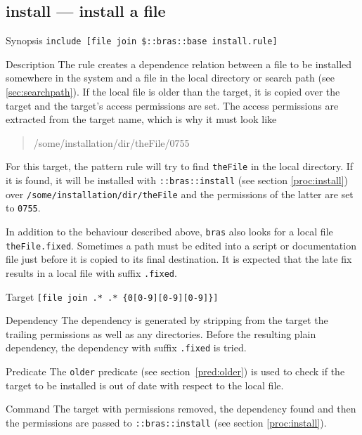 \documentclass[11pt,bibtotoc,idxtotoc]{scrreprt}
\makeatletter
\newcommand{\bras}{\texttt{bras}}
\newcommand{\indextt}[1]{\index{#1@\texttt{#1}}}
\newcommand{\Indextt}[1]{\texttt{#1}\index{#1@\texttt{#1}}}
\makeatother
\begin{document}
\subsection{install --- install a file}
\label{sec:install}
\begin{Describe}
\item[Synopsis] \texttt{include [file join \$::bras::base
    install.rule]}
\item[Description] The rule creates a dependence relation between a
  file to be installed somewhere in the system and a file in the local 
  directory or search path (see \ref{sec:searchpath}). If the local
  file is older than the target, it is copied over the target and the
  target's access permissions are set. The access permissions are
  extracted from the target name, which is why it must look like
  \begin{quote}\ttfamily
    /some/installation/dir/theFile/0755
  \end{quote}
  For this target, the pattern rule will try to find \texttt{theFile}
  in the local directory. If it is found, it will be installed with
  \texttt{::bras::install}\indextt{install} (see section
  \ref{proc:install}) over \texttt{/some/installation/dir/theFile} and
  the permissions of the latter are set to \texttt{0755}.

  In addition to the behaviour described above, \bras{} also looks for
  a local file \texttt{theFile.fixed}. Sometimes a path must be edited 
  into a script or documentation file just before it is copied to its
  final destination. It is expected that the late fix results in a
  local file with suffix \texttt{.fixed}.
\item[Target] \verb|[file join .* .* {0[0-9][0-9][0-9]}]|
\item[Dependency] The dependency is generated by stripping from the
  target the trailing permissions as well as any directories. Before
  the resulting plain dependency, the dependency with suffix
  \texttt{.fixed} is tried.
\item[Predicate] The \Indextt{older} predicate (see
  section~\ref{pred:older}) is used to check if the 
  target to be installed is out of date with respect to the local
  file. 
\item[Command] The target with permissions removed, the dependency
  found and then the permissions are passed to
  \texttt{::bras::install} (see section \ref{proc:install}).
\end{Describe}
\end{document}
